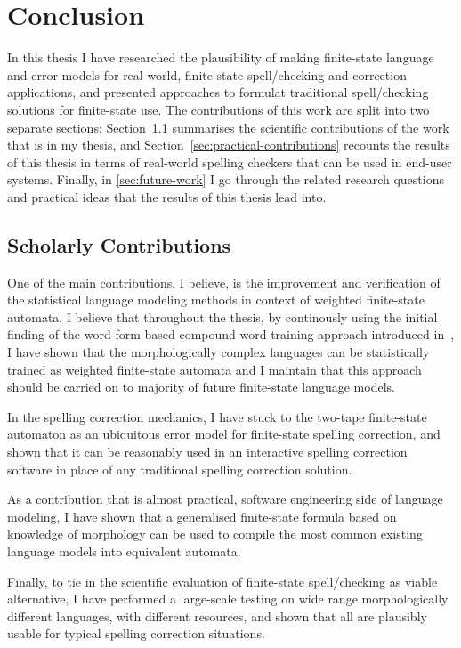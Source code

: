\documentclass[officiallayout]{unihelcompling}
\begin{document}
\chapter{Conclusion}
\label{chap:conclusion}

In this thesis I have researched the plausibility of making finite-state
language and error models for real-world, finite-state spell\-/checking and
correction applications, and presented approaches to formulat traditional
spell\-/checking solutions for finite-state use. The contributions of this work
are split into two separate sections: Section~\ref{sec:scholarly-contributions}
summarises the scientific contributions of the work that is in my thesis, and
Section~\ref{sec:practical-contributions} recounts the results of this thesis
in terms of real-world spelling checkers that can be used in end-user systems.
Finally, in \ref{sec:future-work} I go through the related research questions
and practical ideas that the results of this thesis lead into.

\section{Scholarly Contributions}
\label{sec:scholarly-contributions}

One of the main contributions, I believe, is the improvement and verification
of the statistical language modeling methods in context of weighted 
finite-state automata. I believe that throughout the thesis, by continously
using the initial finding of the word-form-based compound word training
approach introduced in~, I have shown that the
morphologically complex languages can be statistically trained as weighted
finite-state automata and I maintain that this approach should be carried on
to majority of future finite-state language models.

In the spelling correction mechanics, I have stuck to the two-tape finite-state
automaton as an ubiquitous error model for finite-state spelling correction,
and shown that it can be reasonably used in an interactive spelling correction
software in place of any traditional spelling correction solution.

As a contribution that is almost practical, software engineering side of
language modeling, I have shown that a generalised finite-state formula based
on knowledge of morphology can be used to compile the most common existing
language models into equivalent automata.

Finally, to tie in the scientific evaluation of finite-state spell\-/checking as
viable alternative, I have performed a large-scale testing on wide range
morphologically different languages, with different resources, and shown that
all are plausibly usable for typical spelling correction situations.
\end{document}
